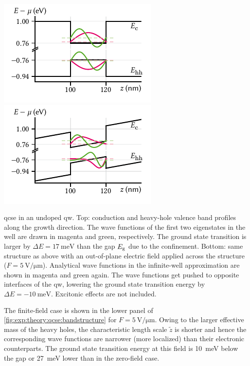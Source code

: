 \begin{marginfigure}[*-34]
    \centering
    \includegraphics{img/pdf/experiment/qw_undoped_0V}
    \includegraphics{img/pdf/experiment/qw_undoped_1V}
    \caption[]{
        \Gls{qcse} in an undoped \acrshort{qw}.
        Top: conduction and heavy-hole valence band profiles along the growth direction.
        The wave functions of the first two eigenstates in the well are drawn in magenta and green, respectively.
        The ground state transition is larger by $\Delta E = \qty{17}{\milli\electronvolt}$ than the gap $E_{\mathrm{g}}$ due to the confinement.
        Bottom: same structure as above with an out-of-plane electric field applied across the structure ($F=\qty{5}{\volt\per\micro\meter}$).
        Analytical wave functions in the infinite-well approximation are shown in magenta and green again.
        The wave functions get pushed to opposite interfaces of the \acrshort{qw}, lowering the ground state transition energy by $\Delta E = -\qty{10}{\milli\electronvolt}$.
        Excitonic effects are not included.
    }
    \label{fig:exp:theory:qcse:bandstructure}
\end{marginfigure}

The finite-field case is shown in the lower panel of \cref{fig:exp:theory:qcse:bandstructure} for $F=\qty{5}{\volt\per\micro\meter}$.
Owing to the larger effective mass of the heavy holes, the characteristic length scale $\tilde{z}$ is shorter and hence the corresponding wave functions are narrower (more localized) than their electronic counterparts.
The ground state transition energy at this field is \qty{10}{\milli\electronvolt} below the gap or \qty{27}{\milli\electronvolt} lower than in the zero-field case.

